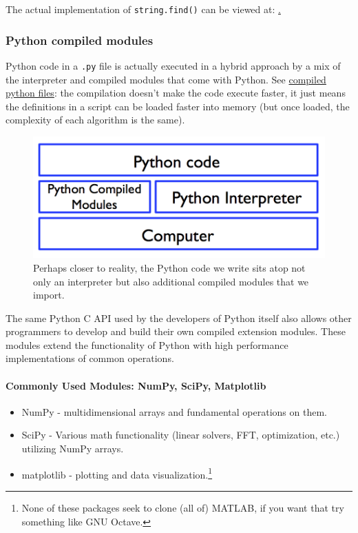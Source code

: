 \documentclass[12pt,letterpaper,twoside]{article}
\begin{document}
The actual implementation of \texttt{string.find()} can be viewed at:
\href{https://github.com/python/cpython/blob/master/Objects/stringlib/fastsearch.h}.

\subsubsection{Python compiled modules}

Python code in a \texttt{.py} file is actually executed in a hybrid
approach by a mix of the interpreter and compiled modules that come
with Python. See
\href{https://docs.python.org/3/tutorial/modules.html#compiled-python-files}{compiled
  python files}: the compilation doesn't make the code execute faster,
it just means the definitions in a script can be loaded faster into
memory (but once loaded, the complexity of each algorithm is the same).

\begin{figure}[h]
\centering
\includegraphics[scale=0.45]{fig/python-compiled-modules.png}
\caption{Perhaps closer to reality, the Python code we write sits atop
not only an interpreter but also additional compiled modules that we
import.}
\end{figure}

The same Python C API used by the developers of Python itself also
allows other programmers to develop and build their own compiled
extension modules.
These modules extend the functionality of Python with high performance
implementations of common operations.

\paragraph{Commonly Used Modules: NumPy, SciPy, Matplotlib}

\begin{itemize}
\item
  NumPy - multidimensional arrays and fundamental operations on them.
\item
  SciPy - Various math functionality (linear solvers, FFT, optimization,
  etc.) utilizing NumPy arrays.
\item
  matplotlib - plotting and data visualization.\footnote{None of these packages seek to clone (all of) MATLAB, if you want that try
something like GNU Octave.}
\end{itemize}
\end{document}
